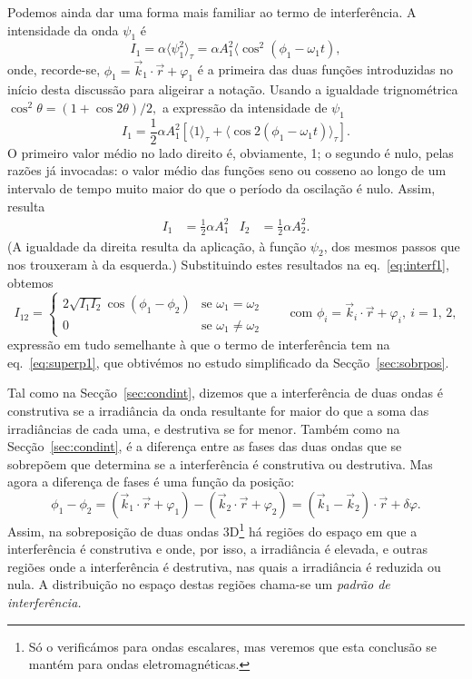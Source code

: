 Podemos ainda dar uma forma mais familiar ao termo de interferência. A
intensidade da onda $\psi_1$ é
\begin{equation*}
I_1=\alpha\langle\psi_1^2\rangle_\tau=\alpha
A_1^2\langle\cos^2(\phi_1-\omega_1t),
\end{equation*}
onde, recorde-se, $\phi_1=\vec k_1\cdot\vec r+\varphi_1$ é a primeira das
duas funções introduzidas no início desta discussão para aligeirar a notação.
Usando a igualdade trignométrica $\cos^2\theta=(1+\cos2\theta)/2,$ a expressão
da intensidade de $\psi_1$
\begin{equation*}
  I_1=\frac{1}{2}\alpha A_1^2\left[\langle1\rangle_\tau+
    \langle\cos2(\phi_1-\omega_1t)\rangle_\tau\right].
\end{equation*}
O primeiro valor médio no lado direito é, obviamente, 1; o segundo é nulo, pelas
razões já invocadas: o valor médio das funções seno ou cosseno ao longo de um
intervalo de tempo muito maior do que o período da oscilação é nulo. Assim,
resulta
\begin{align}\label{eq:scalarwvint}
I_1&=\frac{1}{2}\alpha A_1^2 &
I_2&=\frac{1}{2}\alpha A_2^2.
\end{align}
(A igualdade da direita resulta da aplicação, à função $\psi_2$, dos mesmos
passos que nos trouxeram à da esquerda.) Substituindo estes resultados na
eq.~\eqref{eq:interf1}, obtemos
\begin{equation}\label{eq:interft}
I_{12}=
\begin{cases}
2\sqrt{I_1I_2}\cos(\phi_1-\phi_2) & \text{se }\omega_1=\omega_2\\
0 & \text{se } \omega_1\neq\omega_2
\end{cases}
\qquad
\text{com }\phi_i=\vec k_i\cdot\vec r+\varphi_i,\ i=1,\,2,
\end{equation}
expressão em tudo semelhante à que o termo de interferência tem na
eq.~\eqref{eq:superp1}, que obtivémos no estudo simplificado da
Secção~\ref{sec:sobrpos}.

Tal como na Secção~\ref{sec:condint}, dizemos que a interferência de duas ondas
é construtiva se a irradiância da onda resultante for maior do que a soma das
irradiâncias de cada uma, e destrutiva se for menor. Também como na
Secção~\ref{sec:condint}, é a diferença entre as fases das duas ondas que se
sobrepõem que determina se a interferência é construtiva ou destrutiva. Mas
agora a diferença de fases é uma função da posição:
\begin{equation}
\phi_1-\phi_2=(\vec k_1\cdot\vec r+\varphi_1) - (\vec k_2\cdot\vec
r+\varphi_2)=(\vec k_1-\vec k_2)\cdot\vec r+\delta\varphi.
\end{equation}
Assim, na sobreposição de duas ondas 3D\footnote{Só o verificámos para ondas
escalares, mas veremos que esta conclusão se mantém para ondas
eletromagnéticas.} há regiões do espaço em que a interferência é construtiva e
onde, por isso, a irradiância é elevada, e outras regiões onde a interferência é
destrutiva, nas quais a irradiância é reduzida ou nula. A distribuição no espaço
destas regiões chama-se um \emph{padrão de interferência.} 

